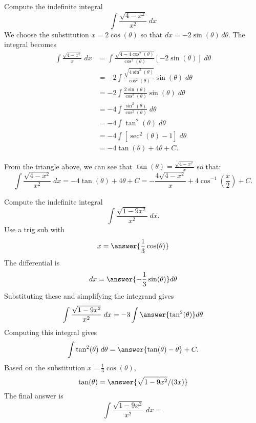 \documentclass{ximera}
\begin{document}
\begin{example}
Compute the indefinite integral
\[
\int \frac{\sqrt{4-x^2}}{x^2} \; dx
\]
We choose the substitution $x = 2\cos(\theta)$ so that $dx = -2\sin(\theta) \, d\theta$.
The integral becomes
\begin{align*}
\int \frac{\sqrt{4-x^2}}{x} \; dx &= \int \frac{\sqrt{4-4\cos^2(\theta)}}{\cos^2(\theta)} [-2\sin(\theta)] \; d\theta\\
                                  &= -2\int \frac{\sqrt{4\sin^2(\theta)}}{\cos^2(\theta)}  \sin(\theta) \; d\theta\\
                                  &= -2\int \frac{2\sin(\theta)}{\cos^2(\theta)}  \sin(\theta) \; d\theta\\
 &= -4\int \frac{\sin^2(\theta)}{\cos^2(\theta)}  \; d\theta\\
 &= -4\int \tan^2(\theta)  \; d\theta\\
&= -4\int [\sec^2(\theta) - 1] \; d\theta\\
&= -4\tan(\theta) + 4\theta + C.
\end{align*}

From the triangle above, we can see that $\tan(\theta) = \frac{\sqrt{4-x^2}}{x}$ so that:
\[
\int \frac{\sqrt{4-x^2}}{x^2} \; dx = -4\tan(\theta) + 4\theta + C = -\frac{4\sqrt{4-x^2}}{x} + 4\cos^{-1}\left(\frac{x}{2}\right) + C. 
\]

\end{example}



\begin{problem}

Compute the indefinite integral
\[
\int \frac{\sqrt{1-9x^2}}{x^2} \; dx.
\]
Use a trig sub with\\
\[
x = \answer{\frac13\cos(\theta)}
\]
The differential is\\
\[
dx = \answer{-\frac13\sin(\theta)}d\theta
\]
Substituting these and simplifying the integrand gives\\
\[
\int \frac{\sqrt{1-9x^2}}{x^2} \; dx = -3\int \answer{\tan^2(\theta)} d\theta
\]
Computing this integral gives
\[
\int \tan^2(\theta) \; d\theta = \answer{\tan(\theta) - \theta} + C.
\]
Based on the substitution $x = \frac13 \cos(\theta)$, \\
\[
\tan(\theta) = \answer{\sqrt{1-9x^2}/(3x)}
\]
The final answer is
\[
\int  \frac{\sqrt{1-9x^2}}{x^2} \; dx = 
\]
\begin{center}
\begin{multipleChoice}
\end{multipleChoice}
\end{center}





\end{problem}
\end{document}
